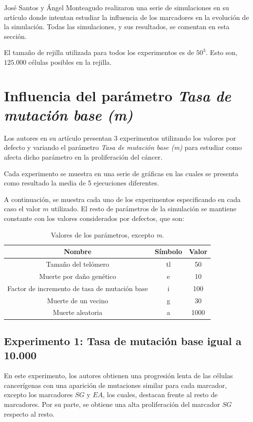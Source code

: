 José Santos y Ángel Monteagudo realizaron una serie de simulaciones en su artículo
donde intentan estudiar la influencia de los marcadores en la evolución de la simulación.
Todas las simulaciones, y sus resultados, se comentan en esta sección.

El tamaño de rejilla utilizada para todos los experimentos es de $50^3$. Esto son,
$125.000$ células posibles en la rejilla.

\section{Influencia del parámetro \textit{Tasa de mutación base (m)}}

Los autores en su artículo presentan 3 experimentos utilizando los valores por defecto
y variando el parámetro \textit{Tasa de mutación base (m)} para estudiar como afecta
dicho parámetro en la proliferación del cáncer.

Cada experimento se muestra en una serie de gráficas en las cuales se presenta
como resultado la media de 5 ejecuciones diferentes.

A continuación, se muestra cada uno de los experimentos especificando en cada caso
el valor $m$ utilizado. El resto de parámetros de la simulación se mantiene constante
con los valores considerados por defectos, que son:

\begin{table}[h!]
  \centering
  \caption{Valores de los parámetros, excepto \textit{m}.}
  \label{tab:table1}
  \begin{tabular}{ccc}
    \toprule
    Nombre & Símbolo & Valor\\
    \midrule
    Tamaño del telómero & tl & 50\\
    Muerte por daño genético & e & 10\\
    Factor de incremento de tasa de mutación base & i & 100\\
    Muerte de un vecino & g & 30\\
    Muerte aleatoria & a & 1000\\
    \bottomrule
  \end{tabular}
\end{table}

\subsection{Experimento 1: Tasa de mutación base igual a 10.000}

En este experimento, los autores obtienen una progresión lenta de las células
cancerígenas con una aparición de mutaciones similar para cada marcador, excepto
los marcadores $SG$ y $EA$, los cuales, destacan frente al resto de marcadores. Por su parte,
se obtiene una alta proliferación del marcador $SG$ respecto al resto.

